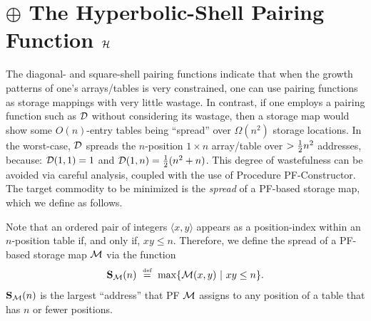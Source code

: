 \bigskip

\noindent {}

\section{$\oplus$ The Hyperbolic-Shell Pairing Function $\mbox{$\cal H$}$}
\label{Appendix:hyp-shell-pair-fn}

The diagonal- and square-shell pairing functions indicate that when the growth patterns of one's arrays/tables is very constrained, one can use pairing functions as storage mappings with very little wastage.  In contrast, if one employs a pairing function such as $\mbox{$\cal D$}$ without considering its wastage, then a storage map would show some $O(n)$-entry tables being ``spread'' over $\Omega(n^2)$ storage locations.  In the worst-case, $\mbox{$\cal D$}$ spreads the $n$-position $1 \times n$ array/table over $> {1 \over 2} n^2$ addresses, because: $\mbox{$\cal D$}(1,1) = 1$ and $\mbox{$\cal D$}(1,n) = {1 \over 2} (n^2 + n)$.  This degree of wastefulness can be avoided via careful analysis, coupled with the use of Procedure PF-Constructor.  The target commodity to be minimized is the {\it spread} of a PF-based storage map, which we define as follows.

\medskip

Note that an ordered pair of integers $\langle x,y \rangle$ appears as a position-index within an $n$-position table if, and only if, $xy \leq n$.  Therefore, we define the spread of a PF-based storage map $\mbox{$\cal M$}$ via the function
\begin{equation}
\label{e.compact}
{\bf S}_{\cal M}(n) \ \stackrel{\mbox{{\tiny def}}}{=} \ \max\{ \mbox{$\cal M$}(x, y) \ | \ xy \leq n \}.
\end{equation}
${\bf S}_{\cal M}(n)$ is the largest ``address'' that PF $\mbox{$\cal M$}$ assigns to any position of a table that has $n$ or fewer positions.

